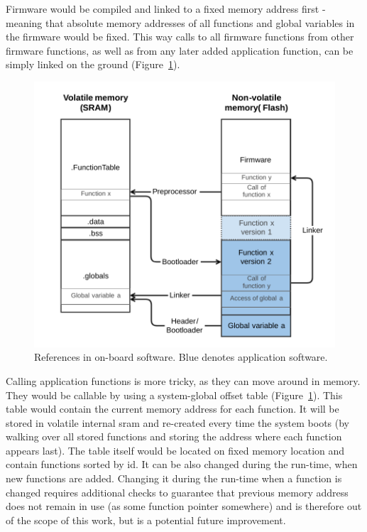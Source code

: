 Firmware would be compiled and linked to a fixed memory address first - meaning that absolute memory addresses of all functions and global variables in the firmware would be fixed. This way calls to all firmware functions from other firmware functions, as well as from any later added application function, can be simply linked on the ground (Figure~\ref{fig:swLink}).

\begin{figure}[t]
	\centering
	\includegraphics[width=\textwidth]{figures/Software_linking.pdf}
	\caption{References in on-board software. Blue denotes application software.}
	\label{fig:swLink}
\end{figure}

Calling application functions is more tricky, as they can move around in memory. They would be callable by using a system-global offset table (Figure~\ref{fig:swLink}). This table would contain the current memory address for each function. It will be stored in volatile internal \gls{sram} and re-created every time the system boots (by walking over all stored functions and storing the address where each function appears last). The table itself would be located on fixed memory location and contain functions sorted by id. It can be also changed during the run-time, when new functions are added. Changing it during the run-time when a function is changed requires additional checks to guarantee that previous memory address does not remain in use (as some function pointer somewhere) and is therefore out of the scope of this work, but is a potential future improvement.


